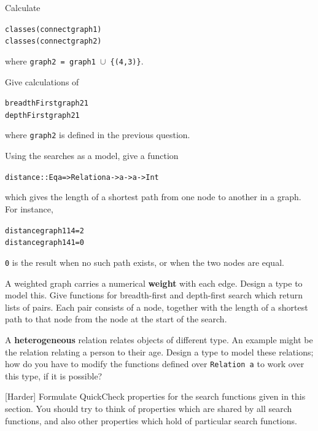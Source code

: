 \begin{exercises}

\item
Calculate
\begin{alltt}
classes (connect graph1)
classes (connect graph2)
\end{alltt}
where \texttt{graph2 = graph1 \(\cup\) \{(4,3)\}}.

\item
Give calculations of 
\begin{alltt}
breadthFirst graph2 1
depthFirst graph2 1
\end{alltt}
where \texttt{graph2} is defined in the previous question.

\item
Using the searches as a model, give a function
\begin{alltt}
distance :: Eq a => Relation a -> a -> a -> Int
\end{alltt}
which gives the length of a shortest path from one node to another in a
graph. For instance,
\begin{alltt}
distance graph1 1 4 = 2
distance graph1 4 1 = 0
\end{alltt}
\texttt{0} is the result when no such path exists, or when the two nodes are
equal. 

\item
A weighted graph carries a numerical \textbf{weight} with each edge. Design a type to
model this. Give functions for breadth-first and depth-first search which
return lists of pairs. Each pair consists of a node, together with the
length of a shortest path to that node from the node at the start of the
search.

\item
A \textbf{heterogeneous} relation relates objects of different type. An
example might be the relation relating a person to their age. Design a type
to model these relations; how do you have to modify the functions defined over
\texttt{Relation a} to work over this type, if it is possible?


\item {[Harder]}
Formulate QuickCheck properties for the search functions given in this section. You should try to think of properties which are shared by all search functions, and also other properties which hold of particular search functions.





\end{exercises}



